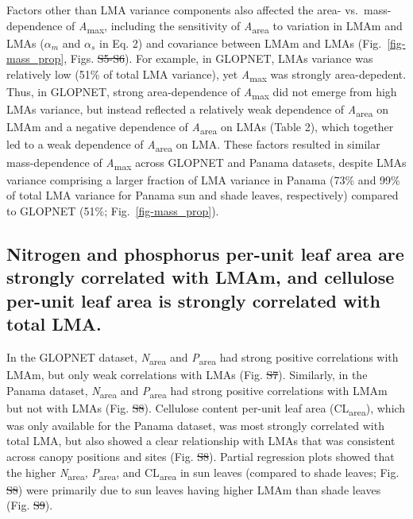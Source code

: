 \documentclass[
  12pt,
  letterpaper,
  DIV=11,
  numbers=noendperiod]{scrartcl}
\providecommand{\DIFadd}[1]{{\protect\color{blue}\uwave{#1}}} %
\providecommand{\DIFdel}[1]{{\protect\color{red}\sout{#1}}}                      %
\providecommand{\DIFaddbegin}{} %
\providecommand{\DIFaddend}{} %
\providecommand{\DIFdelbegin}{} %
\providecommand{\DIFdelend}{} %
\newcommand{\DIFscaledelfig}{0.5}
\newlength{\DIFdelgraphicswidth} %
\newlength{\DIFdelgraphicsheight} %
\newcommand{\DIFaddincludegraphics}[2][]{{\color{blue}\fbox{\DIFOincludegraphics[#1]{#2}}}} %
\newcommand{\DIFdelincludegraphics}[2][]{%
\sbox{\DIFdelgraphicsbox}{\DIFOincludegraphics[#1]{#2}}%
\settoboxwidth{\DIFdelgraphicswidth}{\DIFdelgraphicsbox} %
\settoboxtotalheight{\DIFdelgraphicsheight}{\DIFdelgraphicsbox} %
\scalebox{\DIFscaledelfig}{%
\parbox[b]{\DIFdelgraphicswidth}{\usebox{\DIFdelgraphicsbox}\\[-\baselineskip] \rule{\DIFdelgraphicswidth}{0em}}\llap{\resizebox{\DIFdelgraphicswidth}{\DIFdelgraphicsheight}{%
\setlength{\unitlength}{\DIFdelgraphicswidth}%
\begin{picture}(1,1)%
\thicklines\linethickness{2pt} %
{\color[rgb]{1,0,0}\put(0,0){\framebox(1,1){}}}%
{\color[rgb]{1,0,0}\put(0,0){\line( 1,1){1}}}%
{\color[rgb]{1,0,0}\put(0,1){\line(1,-1){1}}}%
\end{picture}%
}\hspace*{3pt}}} %
} %
\DeclareRobustCommand{\DIFaddbegin}{\DIFOaddbegin \let\includegraphics\DIFaddincludegraphics} %
\DeclareRobustCommand{\DIFaddend}{\DIFOaddend \let\includegraphics\DIFOincludegraphics} %
\DeclareRobustCommand{\DIFdelbegin}{\DIFOdelbegin \let\includegraphics\DIFdelincludegraphics} %
\DeclareRobustCommand{\DIFdelend}{\DIFOaddend \let\includegraphics\DIFOincludegraphics} %
\begin{document}
Factors other than LMA variance components also affected the area-
vs.~mass-dependence of \emph{A}\textsubscript{max}, including the
sensitivity of \emph{A}\textsubscript{area} to variation in LMAm and
LMAs (\(\alpha_m\) and \(\alpha_s\) in Eq. 2) and covariance between
LMAm and LMAs (Fig.~\ref{fig-mass_prop}, Figs. \DIFdelbegin \DIFdel{S5-S6}\DIFdelend \DIFaddbegin \DIFadd{S6-S7}\DIFaddend ). For example, in
GLOPNET, LMAs variance was relatively low (51\% of total LMA variance),
yet \emph{A}\textsubscript{max} was strongly area-depedent. Thus, in
GLOPNET, strong area-dependence of \emph{A}\textsubscript{max} did not
emerge from high LMAs variance, but instead reflected a relatively weak
dependence of \emph{A}\textsubscript{area} on LMAm and a negative
dependence of \emph{A}\textsubscript{area} on LMAs (Table 2), which
together led to a weak dependence of \emph{A}\textsubscript{area} on
LMA. These factors resulted in similar mass-dependence of
\emph{A}\textsubscript{max} across GLOPNET and Panama datasets, despite
LMAs variance comprising a larger fraction of LMA variance in Panama
(73\% and 99\% of total LMA variance for Panama sun and shade leaves,
respectively) compared to GLOPNET (51\%; Fig.~\ref{fig-mass_prop}).

\subsection{Nitrogen and phosphorus per-unit leaf area are strongly
correlated with LMAm, and cellulose per-unit leaf area is strongly
correlated with total
LMA.}\label{nitrogen-and-phosphorus-per-unit-leaf-area-are-strongly-correlated-with-lmam-and-cellulose-per-unit-leaf-area-is-strongly-correlated-with-total-lma.}

In the GLOPNET dataset, \emph{N}\textsubscript{area} and
\emph{P}\textsubscript{area} had strong positive correlations with LMAm,
but only weak correlations with LMAs (Fig. \DIFdelbegin \DIFdel{S7}\DIFdelend \DIFaddbegin \DIFadd{S8}\DIFaddend ). Similarly, in the Panama
dataset, \emph{N}\textsubscript{area} and \emph{P}\textsubscript{area}
had strong positive correlations with LMAm but not with LMAs (Fig. \DIFdelbegin \DIFdel{S8}\DIFdelend \DIFaddbegin \DIFadd{S9}\DIFaddend ).
Cellulose content per-unit leaf area (CL\textsubscript{area}), which was
only available for the Panama dataset, was most strongly correlated with
total LMA, but also showed a clear relationship with LMAs that was
consistent across canopy positions and sites (Fig. \DIFdelbegin \DIFdel{S8}\DIFdelend \DIFaddbegin \DIFadd{S9}\DIFaddend ). Partial
regression plots showed that the higher \emph{N}\textsubscript{area},
\emph{P}\textsubscript{area}, and CL\textsubscript{area} in sun leaves
(compared to shade leaves; Fig. \DIFdelbegin \DIFdel{S8}\DIFdelend \DIFaddbegin \DIFadd{S9}\DIFaddend ) were primarily due to sun leaves
having higher LMAm than shade leaves (Fig. \DIFdelbegin \DIFdel{S9}\DIFdelend \DIFaddbegin \DIFadd{S10}\DIFaddend ).
\end{document}

